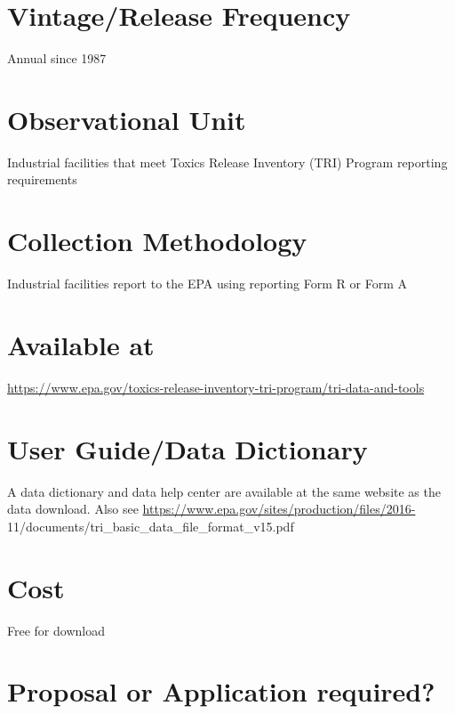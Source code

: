 \documentclass[
]{book}
\begin{document}
\hypertarget{vintagerelease-frequency-89}{%
\section{Vintage/Release Frequency}\label{vintagerelease-frequency-89}}

Annual since 1987

\hypertarget{observational-unit-89}{%
\section{Observational Unit}\label{observational-unit-89}}

Industrial facilities that meet Toxics Release Inventory (TRI) Program reporting requirements

\hypertarget{collection-methodology-89}{%
\section{Collection Methodology}\label{collection-methodology-89}}

Industrial facilities report to the EPA using reporting Form R or Form A

\hypertarget{available-at-89}{%
\section{Available at}\label{available-at-89}}

\url{https://www.epa.gov/toxics-release-inventory-tri-program/tri-data-and-tools}

\hypertarget{user-guidedata-dictionary-89}{%
\section{User Guide/Data Dictionary}\label{user-guidedata-dictionary-89}}

A data dictionary and data help center are available at the same website as the data download. Also see \url{https://www.epa.gov/sites/production/files/2016-} 11/documents/tri\_basic\_data\_file\_format\_v15.pdf

\hypertarget{cost-89}{%
\section{Cost}\label{cost-89}}

Free for download

\hypertarget{proposal-or-application-required-89}{%
\section{Proposal or Application required?}\label{proposal-or-application-required-89}}
\end{document}
